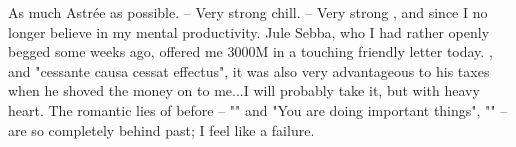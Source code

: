 
As much Astrée as possible. -- Very strong chill. -- Very strong , and since I no longer believe in my mental productivity. Jule Sebba, who I had rather openly begged some weeks ago, offered me 3000M in a touching friendly letter today. , and "cessante causa cessat effectus", it was also very advantageous to his taxes when he shoved the money on to me...I will probably take it, but with heavy heart. The romantic lies of before -- "" and "You are doing important things", "" -- are so completely behind past; I feel like a failure.

\missing

